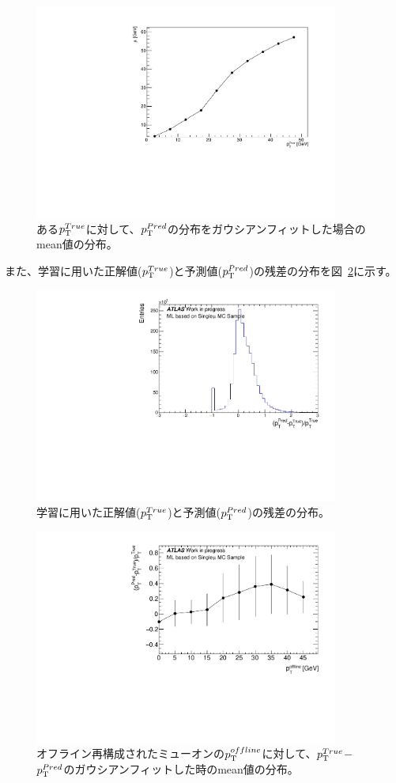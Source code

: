 \begin{figure}[tb]
  \centering
  \includegraphics[clip, width=10cm]{fig/4/tp_Gausmean_MC.pdf}
  \caption{ある$p_{\rm{T}}^{True}$に対して、$p_{\rm{T}}^{Pred}$の分布をガウシアンフィットした場合のmean値の分布。}
  \label{fig:Gausmu_MC}
\end{figure}
また、学習に用いた正解値($p_{\rm{T}}^{True}$)と予測値($p_{\rm{T}}^{Pred}$)の残差の分布を図~\ref{fig:MC_predtrue}に示す。
\begin{figure}[htb]
  \centering
  \includegraphics[clip, width=10cm]{fig/4/MC_predtrue.pdf}
  \caption{学習に用いた正解値($p_{\rm{T}}^{True}$)と予測値($p_{\rm{T}}^{Pred}$)の残差の分布。}
  \label{fig:MC_predtrue}
\end{figure}

\begin{figure}[htb]
  \centering
  \includegraphics[clip, width=10cm]{fig/4/MC_predtrue_perpt.pdf}
  \caption{オフライン再構成されたミューオンの$p_{\rm{T}}^{offline}$に対して、$p_{\rm{T}}^{True}$$-$$p_{\rm{T}}^{Pred}$のガウシアンフィットした時のmean値の分布。}
  \label{fig:MC_predtrue_perpt}
\end{figure}

